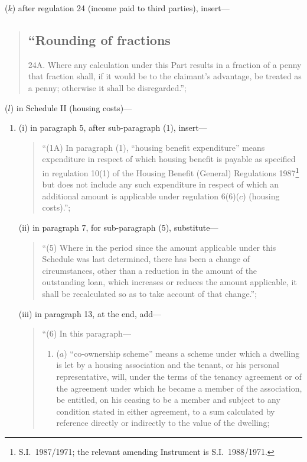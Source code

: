 \documentclass[12pt,a4paper]{article}
\begin{document}
\begin{enumerate}
($k$) after regulation 24 (income paid to third parties), insert—
\begin{quotation}
\subsection*{“Rounding of fractions}

24A.  Where any calculation under this Part results in a fraction of a penny that fraction shall, if it would be to the claimant’s advantage, be treated as a penny; otherwise it shall be disregarded.”;
\end{quotation}

($l$) in Schedule II (housing costs)—
\begin{enumerate}\item[]
(i) in paragraph 5, after sub-paragraph (1), insert—
\begin{quotation}
“(1A) In paragraph (1), “housing benefit expenditure” means expenditure in respect of which housing benefit is payable as specified in regulation 10(1) of the Housing Benefit (General) Regulations 1987\footnote{S.I.\ 1987/1971; the relevant amending Instrument is S.I.\ 1988/1971.} but does not include any such expenditure in respect of which an additional amount is applicable under regulation 6(6)($c$)  (housing costs).”;
\end{quotation}

(ii) in paragraph 7, for sub-paragraph (5), substitute—

\begin{quotation}
“(5) Where in the period since the amount applicable under this Schedule was last determined, there has been a change of circumstances, other than a reduction in the amount of the outstanding loan, which increases or reduces the amount applicable, it shall be recalculated so as to take account of that change.”;
\end{quotation}

(iii) in paragraph 13, at the end, add—
\begin{quotation}
“(6) In this paragraph—
\begin{enumerate}\item[]
($a$) “co-ownership scheme” means a scheme under which a dwelling is let by a housing association and the tenant, or his personal representative, will, under the terms of the tenancy agreement or of the agreement under which he became a member of the association, be entitled, on his ceasing to be a member and subject to any condition stated in either agreement, to a sum calculated by reference directly or indirectly to the value of the dwelling;


\end{enumerate}
\end{quotation}
\end{enumerate}
\end{enumerate}
\end{document}
